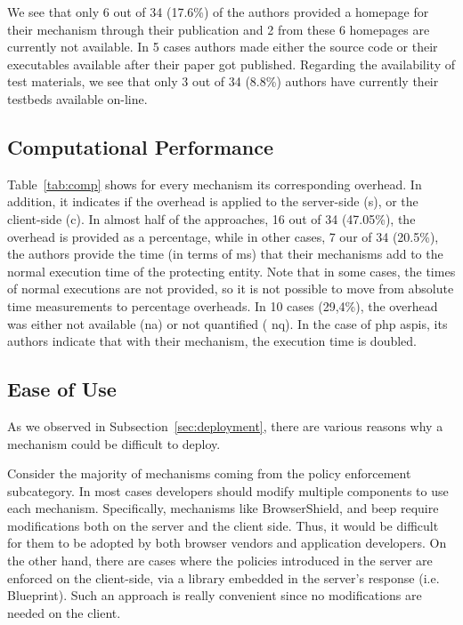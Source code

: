 \documentclass[conference]{IEEEtran}
\begin{document}
We see that only 6 out of 34 (17.6\%) of the authors provided a
homepage for their mechanism through their publication and 2 from
these 6 homepages are currently not available. In 5 cases authors made
either the source code or their executables available after their
paper got published. Regarding the availability of test materials, we
see that only 3 out of 34 (8.8\%) authors have currently their
testbeds available on-line.

\subsection{Computational Performance}

Table~\ref{tab:comp} shows for every mechanism its corresponding
overhead. In addition, it indicates if the overhead is applied to the
server-side ({\sc s}), or the client-side ({\sc c}). In almost half of
the approaches, 16 out of 34 (47.05\%), the overhead is provided as a
percentage, while in other cases, 7 our of 34 (20.5\%), the authors
provide the time (in terms of ms) that their mechanisms add to the
normal execution time of the protecting entity. Note that in some
cases, the times of normal executions are not provided,
so it is not possible to move from absolute
time measurements to percentage overheads. In 10 cases (29,4\%), the
overhead was either not available ({\sc na}) or not quantified ({\sc
  nq}). In the case of {\sc php aspis}, its authors indicate that with
their mechanism, the execution time is doubled.

\subsection{Ease of Use}
\label{sec:deploy2}

As we observed in Subsection~\ref{sec:deployment},
there are various reasons why a mechanism could
be difficult to deploy.

Consider the majority of mechanisms coming from
the policy enforcement subcategory. In most cases
developers should modify multiple components
to use each mechanism. Specifically, mechanisms like
BrowserShield, and {\sc beep} require modifications
both on the server and the client side.
Thus, it would be difficult for them to be adopted by
both browser vendors and application developers.
On the other hand, there are cases where the policies
introduced in the server are enforced on the client-side,
via a library embedded in the server's response
(i.e. Blueprint). Such an approach is really convenient
since no modifications are needed on the client.
\end{document}
